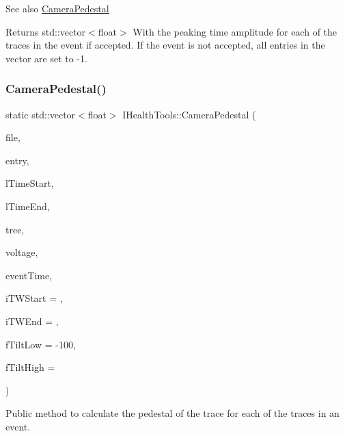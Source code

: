 \begin{DoxySeeAlso}{See also}
\hyperlink{classIHealthTools_aa6bdf03f0f7595eec0a894c7c73134ea}{Camera\+Pedestal}
\end{DoxySeeAlso}
\begin{DoxyReturn}{Returns}
std\+::vector$<$float$>$ With the peaking time amplitude for each of the traces in the event if accepted. If the event is not accepted, all entries in the vector are set to -\/1. 
\end{DoxyReturn}
\mbox{\label{classIHealthTools_aa6bdf03f0f7595eec0a894c7c73134ea}} 
\subsubsection{\texorpdfstring{Camera\+Pedestal()}{CameraPedestal()}}
{\footnotesize\ttfamily static std\+::vector$<$float$>$ I\+Health\+Tools\+::\+Camera\+Pedestal (\begin{DoxyParamCaption}\item[{\hyperlink{classIFile}{I\+File} $\ast$}]{file,  }\item[{int}]{entry,  }\item[{unsigned long long}]{l\+Time\+Start,  }\item[{unsigned long long}]{l\+Time\+End,  }\item[{std\+::string}]{tree,  }\item[{float}]{voltage,  }\item[{unsigned long long $\ast$}]{event\+Time,  }\item[{int}]{i\+T\+W\+Start = {},  }\item[{int}]{i\+T\+W\+End = {},  }\item[{float}]{f\+Tilt\+Low = {\ttfamily -\/100},  }\item[{float}]{f\+Tilt\+High = {} }\end{DoxyParamCaption})\hspace{0.3cm}{\ttfamily [static]}}



Public method to calculate the pedestal of the trace for each of the traces in an event. 


